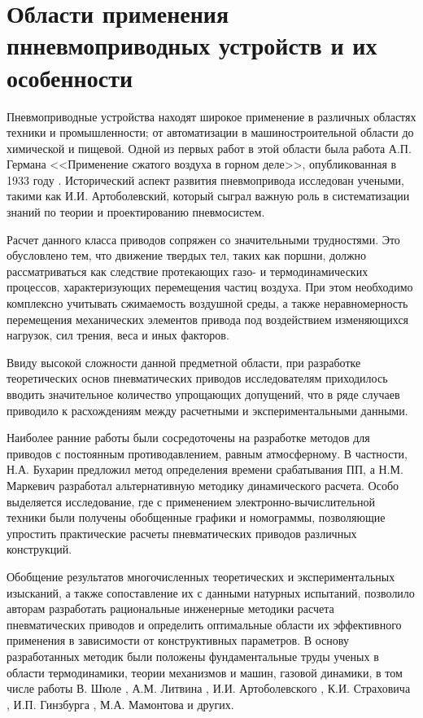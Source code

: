 
\section{Области применения пнневмоприводных устройств и их особенности}\label{sec:ch1/sec1}


Пневмоприводные устройства находят широкое применение в различных областях техники и промышленности; от автоматизации в
машиностроительной области до химической и пищевой. Одной из первых работ в этой области была работа А.П. Германа
<<Применение сжатого воздуха в горном деле>>, опубликованная в 1933 году \cite*{german:a}. Исторический аспект развития пневмопривода
исследован учеными, такими как И.И. Артоболевский, который сыграл важную роль в систематизации знаний по теории и
проектированию пневмосистем.

Расчет данного класса приводов сопряжен со значительными трудностями. Это обусловлено тем, что движение твердых тел,
таких как поршни, должно рассматриваться как следствие протекающих газо- и термодинамических процессов, характеризующих
перемещения частиц воздуха. При этом необходимо комплексно учитывать сжимаемость воздушной среды, а также неравномерность
перемещения механических элементов привода под воздействием изменяющихся нагрузок, сил трения, веса и иных факторов.

Ввиду высокой сложности данной предметной области, при разработке теоретических основ пневматических приводов
исследователям приходилось вводить значительное количество упрощающих допущений, что в ряде случаев приводило к
расхождениям между расчетными и экспериментальными данными.

Наиболее ранние
работы были сосредоточены на разработке методов для приводов с постоянным противодавлением, равным атмосферному.
В частности, Н.А. Бухарин \cite*{бухарин} предложил метод определения времени срабатывания ПП, а Н.М. Маркевич \cite*{маркевич}
разработал альтернативную методику динамического расчета. Особо выделяется исследование, где с применением электронно-вычислительной
техники были получены обобщенные графики и номограммы, позволяющие упростить практические расчеты пневматических приводов различных
конструкций.

Обобщение результатов многочисленных теоретических и экспериментальных изысканий, а также сопоставление их с
данными натурных испытаний, позволило авторам разработать рациональные инженерные методики расчета пневматических
приводов и определить оптимальные области их эффективного применения в зависимости от конструктивных параметров.
В основу разработанных методик были положены фундаментальные труды ученых в области термодинамики, теории механизмов
и машин, газовой динамики, в том числе работы В. Шюле \cite*{шюле:техническая_термодинамика}, А.М. Литвина \cite*{литвин:техническая_термодинамика},
И.И. Артоболевского \cite*{артболевский:теория_механизмов_машин}, К.И. Страховича \cite*{страхович:прикладная_газодинамика},
И.П. Гинзбурга \cite*{гинзбург:прикладная_газодинамика}, М.А. Мамонтова \cite*{мамонтов:вопросы_термодинамики,мамонтов:некоторые_случаи_течения_газа}
и других.

